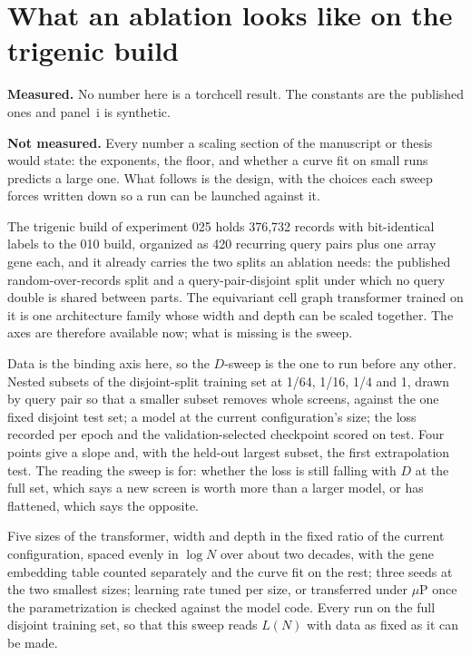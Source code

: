 
\section{What an ablation looks like on the trigenic build}
\label{sec:torchcell}

\begin{keybox}
\textbf{Measured.} No number here is a torchcell result. The constants
are the published ones and panel~i is synthetic.

\textbf{Not measured.} Every number a scaling section of the manuscript or thesis
would state: the exponents, the floor, and whether a curve fit on small runs
predicts a large one. What follows is the design, with the choices each sweep
forces written down so a run can be launched against it.
\end{keybox}

The trigenic build of experiment 025 holds 376{,}732 records with bit-identical
labels to the 010 build, organized as 420 recurring query pairs plus one array
gene each, and it already carries the two splits an ablation needs: the published
random-over-records split and a query-pair-disjoint split under which no query
double is shared between parts. The equivariant cell graph transformer trained on
it is one architecture family whose width and depth can be scaled together. The
axes are therefore available now; what is missing is the sweep.

Data is the binding axis here, so the $D$-sweep is the one to run before any
other. Nested subsets of the disjoint-split training set at 1/64, 1/16, 1/4 and 1,
drawn by query pair so that a smaller subset removes whole screens, against the
one fixed disjoint test set; a model at the current configuration's size; the
loss recorded per epoch and the validation-selected checkpoint scored on test.
Four points give a slope and, with the held-out largest subset, the first
extrapolation test. The reading the sweep is for: whether the loss is still
falling with $D$ at the full set, which says a new screen is worth more than a
larger model, or has flattened, which says the opposite.

Five sizes of the transformer, width and depth in the fixed ratio of the current
configuration, spaced evenly in $\log N$ over about two decades, with the gene
embedding table counted separately and the curve fit on the rest; three seeds at
the two smallest sizes; learning rate tuned per size, or transferred under $\mu$P
once the parametrization is checked against the model code. Every run on the full
disjoint training set, so that this sweep reads $L(N)$ with data as fixed as it
can be made.

